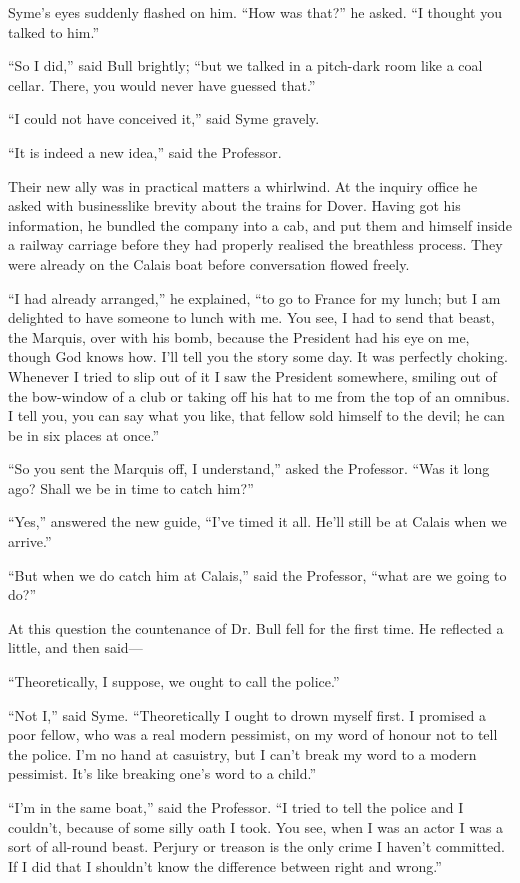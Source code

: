 \documentclass{book}
\begin{document}
Syme’s eyes suddenly flashed on him. “How was that?” he asked. “I thought you talked to him.”

“So I did,” said Bull brightly; “but we talked in a pitch-dark room like a coal cellar. There, you would never have guessed that.”

“I could not have conceived it,” said Syme gravely.

“It is indeed a new idea,” said the Professor.

Their new ally was in practical matters a whirlwind. At the inquiry office he asked with businesslike brevity about the trains for Dover. Having got his information, he bundled the company into a cab, and put them and himself inside a railway carriage before they had properly realised the breathless process. They were already on the Calais boat before conversation flowed freely.

“I had already arranged,” he explained, “to go to France for my lunch; but I am delighted to have someone to lunch with me. You see, I had to send that beast, the Marquis, over with his bomb, because the President had his eye on me, though God knows how. I’ll tell you the story some day. It was perfectly choking. Whenever I tried to slip out of it I saw the President somewhere, smiling out of the bow-window of a club or taking off his hat to me from the top of an omnibus. I tell you, you can say what you like, that fellow sold himself to the devil; he can be in six places at once.”

“So you sent the Marquis off, I understand,” asked the Professor. “Was it long ago? Shall we be in time to catch him?”

“Yes,” answered the new guide, “I’ve timed it all. He’ll still be at Calais when we arrive.”

“But when we do catch him at Calais,” said the Professor, “what are we going to do?”

At this question the countenance of Dr. Bull fell for the first time. He reflected a little, and then said—

“Theoretically, I suppose, we ought to call the police.”

“Not I,” said Syme. “Theoretically I ought to drown myself first. I promised a poor fellow, who was a real modern pessimist, on my word of honour not to tell the police. I’m no hand at casuistry, but I can’t break my word to a modern pessimist. It’s like breaking one’s word to a child.”

“I’m in the same boat,” said the Professor. “I tried to tell the police and I couldn’t, because of some silly oath I took. You see, when I was an actor I was a sort of all-round beast. Perjury or treason is the only crime I haven’t committed. If I did that I shouldn’t know the difference between right and wrong.”
\end{document}

